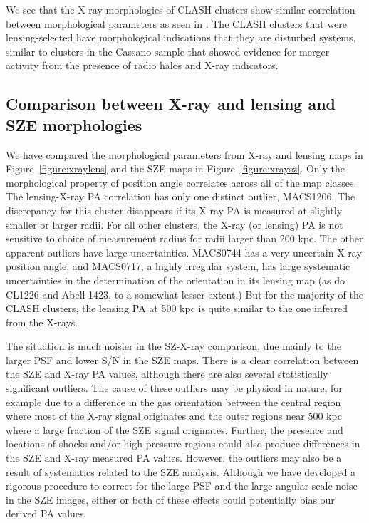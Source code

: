 \documentclass[iop,twocolumn]{emulateapj}
\begin{document}
{We see that the X-ray morphologies of CLASH clusters show similar correlation between morphological parameters as
seen in \citet{2010ApJ...721L..82C}. The CLASH clusters that were lensing-selected have morphological indications that they are
disturbed systems, similar to clusters in the Cassano sample that showed evidence for merger activity from
the presence of radio halos and X-ray indicators.

\subsection{Comparison between X-ray and lensing and SZE morphologies}

We have compared the morphological parameters from X-ray and lensing maps in Figure~\ref{figure:xraylens}
and the SZE maps in Figure~\ref{figure:xraysz}. Only the morphological property of position angle 
 correlates across all of the map classes.  The lensing-X-ray PA correlation has
only one distinct outlier, MACS1206. The discrepancy for this cluster disappears if its X-ray PA is measured
at slightly smaller or larger radii. For all other clusters, the X-ray (or lensing) PA is not sensitive to choice of 
measurement radius for radii larger than 200 kpc.  The other apparent outliers have large uncertainties. 
MACS0744 has a very uncertain X-ray position angle,
and MACS0717, a highly irregular system, has large systematic uncertainties in the determination
of the orientation in its lensing map (as do CL1226 and Abell 1423, to a somewhat lesser extent.)
 But for the majority of the CLASH clusters, the lensing PA at 500 kpc is quite similar to the one inferred from the X-rays. 
  
The situation is much noisier in the SZ-X-ray comparison, due mainly to the larger PSF and lower S/N in the SZE maps. There is a clear correlation between the
SZE and X-ray PA values, although there are also several statistically significant outliers. The cause of these outliers may be physical in nature, for example due
to a difference in the gas orientation between the central region where most of the X-ray signal originates and the outer regions near 500 kpc where a large
fraction of the SZE signal originates. Further, the presence and locations of shocks and/or high pressure regions could also produce differences in the SZE and
X-ray measured PA values. However, the outliers may also be a result of systematics related to the SZE analysis. Although we have developed a rigorous
procedure to correct for the large PSF and the large angular scale noise in the SZE images, either or both of these effects could potentially bias our derived PA
values.

}
\end{document}

